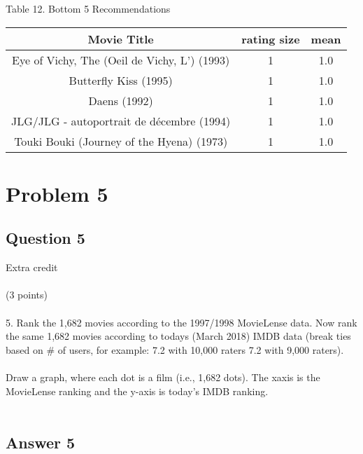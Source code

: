 \documentclass[10pt,letterpaper]{article}
\begin{document}
Table 12. Bottom 5 Recommendations\\
\begin{center}
  \begin{tabular}{ | c | c | c }
    \hline
     Movie Title & rating size & mean\\ \hline                                                                               
     Eye of Vichy, The (Oeil de Vichy, L') (1993) & 1 & 1.0\\ \hline                                                                               
     Butterfly Kiss (1995)                        & 1 & 1.0\\ \hline                                                                               
     Daens (1992)                                 & 1 & 1.0\\ \hline                                                                               
     JLG/JLG - autoportrait de décembre (1994)    & 1 & 1.0\\ \hline                                                                               
     Touki Bouki (Journey of the Hyena) (1973)    & 1 & 1.0\\ \hline                                                                               
    \hline
  \end{tabular}
\end{center}

\pagebreak
\section{Problem 5}
\subsection{Question 5}
Extra credit\\
\\
(3 points)\\
\\
5.  Rank the 1,682 movies according to the 1997/1998 MovieLense data.  Now rank the same 1,682 movies according to todays (March 2018) IMDB data (break ties based on \# of users, for example: 7.2 with 10,000 raters 7.2 with 9,000 raters).\\
\\
Draw a graph, where each dot is a film (i.e., 1,682 dots).  The x\-axis is the MovieLense ranking and the y-axis is today's IMDB ranking.\\
\\
\subsection{Answer 5}


\pagebreak
\end{document}
